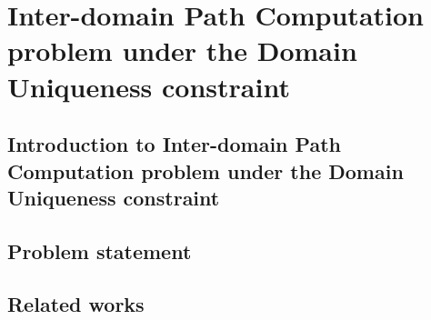 \chapter{Inter-domain Path Computation problem under the Domain Uniqueness constraint}
\label{chap:chap2}

\section{Introduction to Inter-domain Path Computation problem under the Domain Uniqueness constraint}
\label{def:intro}


\section{Problem statement}
\label{def:statement}


\section{Related works}
\label{def:related}
